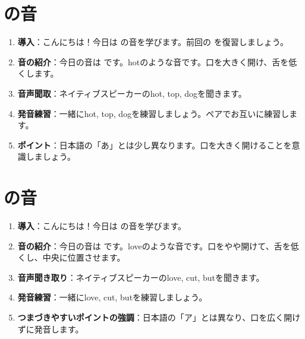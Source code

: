 \documentclass[book,jafontscale=0.9247]{jlreq}
\begin{document}
\section{\textipa{/\textscripta /} の音}
\begin{enumerate}
    \item \textbf{導入}：こんにちは！今日は \textipa{/\textscripta /} の音を学びます。前回の  を復習しましょう。
    \item \textbf{音の紹介}：今日の音は \textipa{/\textscripta /} です。hotのような音です。口を大きく開け、舌を低くします。
    \item \textbf{音声聞取}：ネイティブスピーカーのhot, top, dogを聞きます。
    \item \textbf{発音練習}：一緒にhot, top, dogを練習しましょう。ペアでお互いに練習します。
    \item \textbf{ポイント}：日本語の「あ」とは少し異なります。口を大きく開けることを意識しましょう。
\end{enumerate}

\section{\textipa{/\textturnv /} の音}
\begin{enumerate}
    \item \textbf{導入}：こんにちは！今日は \textipa{/\textturnv /} の音を学びます。
    \item \textbf{音の紹介}：今日の音は \textipa{/\textturnv /} です。loveのような音です。口をやや開けて、舌を低くし、中央に位置させます。
    \item \textbf{音声聞き取り}：ネイティブスピーカーのlove, cut, butを聞きます。
    \item \textbf{発音練習}：一緒にlove, cut, butを練習しましょう。
    \item \textbf{つまづきやすいポイントの強調}：日本語の「ア」とは異なり、口を広く開けずに発音します。
\end{enumerate}
\end{document}
